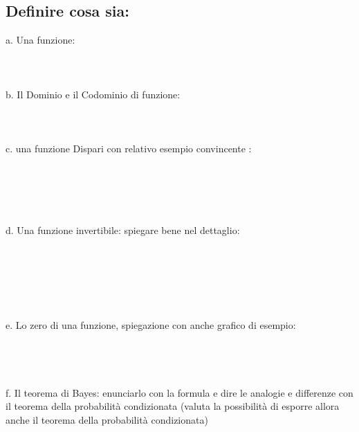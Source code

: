 \documentclass{article}
\begin{document}
    \subsection{Definire cosa sia:}
    a. Una funzione: \\\\\\\\
    b. Il Dominio e il Codominio di funzione: \\\\\\\\
    c. una funzione Dispari con relativo esempio convincente : \\\\\\\\\\\\
    d. Una funzione invertibile: spiegare bene nel dettaglio: \\\\\\\\\\\\\\
    e. Lo zero di una funzione, spiegazione con anche grafico di esempio: \\\\\\\\\\
    f. Il teorema di Bayes: enunciarlo con la formula e dire le analogie e differenze con il teorema della probabilità condizionata  (valuta la possibilità di esporre allora anche il teorema della probabilità condizionata) \\\\\\\\\\\\\\\\\\\\\\\\\\\\\\\\\\\\\\\\\\\\\\\\\\
\end{document}
